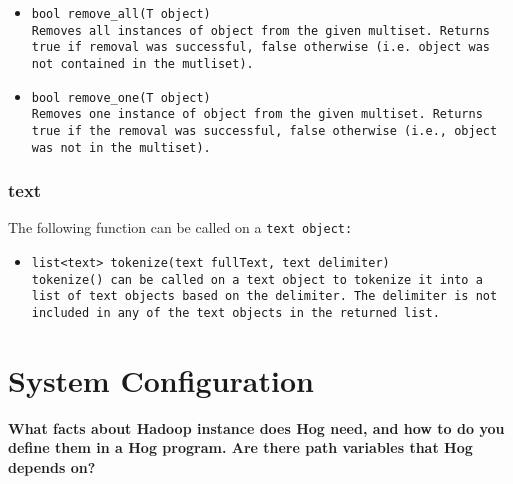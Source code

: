 \documentclass{book}
\begin{document}
\begin{itemize}
\item[] \tt bool remove\_all(T object) \rm \\

Removes all instances of \tt object \rm from the given \tt multiset\rm. Returns
\tt true \rm if removal was successful, \tt false \rm otherwise (i.e. \tt object \rm
was not contained in the \tt mutliset\rm).

\item[] \tt bool remove\_one(T object) \rm \\

Removes one instance of \tt object \rm from the given \tt multiset\rm. Returns
\tt true \rm if the removal was successful, \tt false \rm otherwise (i.e.,
\tt object \rm was not in the \tt multiset\rm).

\end{itemize}


\subsection{text} %
\label{sub:text}

The following function can be called on a \tt text \rm object:

\begin{itemize}

\item[] \tt list<text> tokenize(text fullText, text delimiter) \rm \\

\tt tokenize() \rm can be called on a \tt text \rm object to tokenize it into a
list of \tt text \rm objects based on the delimiter. The delimiter is not included
in any of the \tt text \rm objects in the returned list.

\end{itemize}




\chapter{System Configuration} %
\label{cha:system_configuration}

\textbf{What facts about Hadoop instance does Hog need, and how to do you define
them in a Hog program. Are there path variables that Hog depends on?}
\end{document}
